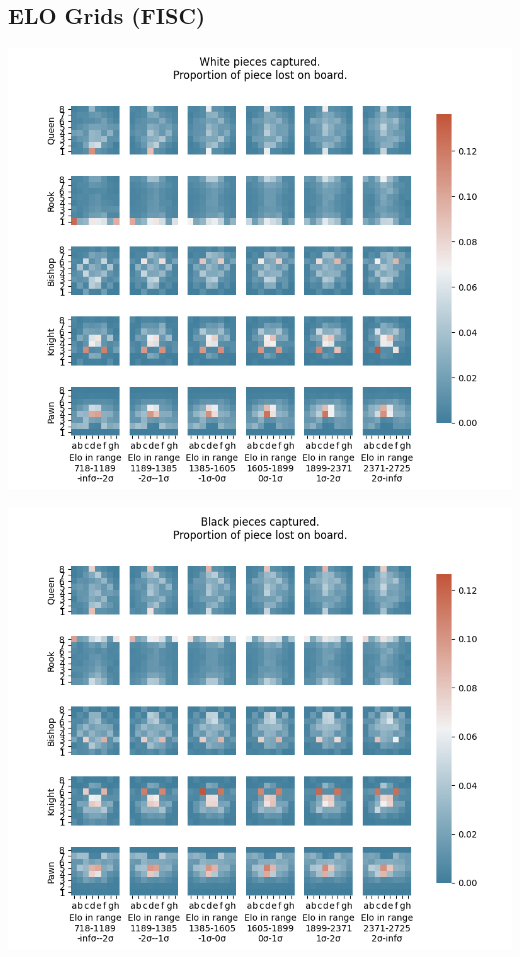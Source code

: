 \documentclass[11pt]{article}
\begin{document}
\subsection{ELO Grids (FISC)}
\label{sec:org1c26a2a}
\begin{center}
\includegraphics[width=\textwidth]{Images/_HEATMAP_Queen_Rook_Bishop_Knight_Pawn_WHITE_ELO.png}
\end{center}

\begin{center}
\includegraphics[width=\textwidth]{Images/_HEATMAP_Queen_Rook_Bishop_Knight_Pawn_BLACK_ELO.png}
\end{center}
\end{document}
